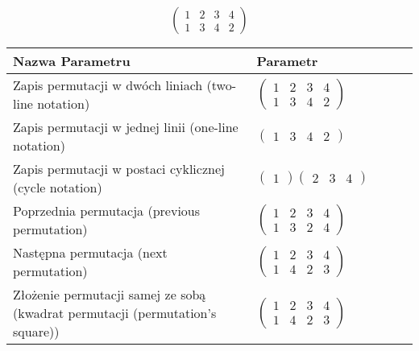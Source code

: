 \documentclass[12pt]{article}
\begin{document}
\subsection{}
\begin{center}
\[
\begin{pmatrix}
	1 & 2 & 3 & 4 \\ 
	1 & 3 & 4 & 2 
\end{pmatrix}
\]

\begin{tabular}{|m{0.6\linewidth}|m{0.4\linewidth}|}
	\hline
	Nazwa Parametru & Parametr \\
	\hline
	Zapis permutacji w dwóch liniach (two-line notation) & $\begin{pmatrix} 1 & 2 & 3 & 4 \\ 
1 & 3 & 4 & 2 \end{pmatrix}$ \\ 
	\hline
	Zapis permutacji w jednej linii (one-line notation) & $\begin{pmatrix} 1 & 3 & 4 & 2 \end{pmatrix}$ \\ 
	\hline
	Zapis permutacji w postaci cyklicznej (cycle notation) & $\begin{pmatrix} 1 \end{pmatrix} \begin{pmatrix} 2 & 3 & 4 \end{pmatrix} $ \\ 
	\hline
	Poprzednia permutacja (previous permutation) & $\begin{pmatrix} 1 & 2 & 3 & 4 \\ 
1 & 3 & 2 & 4 \end{pmatrix}$ \\ 
	\hline
	Następna permutacja (next permutation) & $\begin{pmatrix} 1 & 2 & 3 & 4 \\ 
1 & 4 & 2 & 3 \end{pmatrix}$ \\ 
	\hline
	Złożenie permutacji samej ze sobą (kwadrat permutacji (permutation's square)) & $\begin{pmatrix} 1 & 2 & 3 & 4 \\ 
1 & 4 & 2 & 3 \end{pmatrix}$ \\ 
	\hline
\end{tabular}
\end{center}
\end{document}
